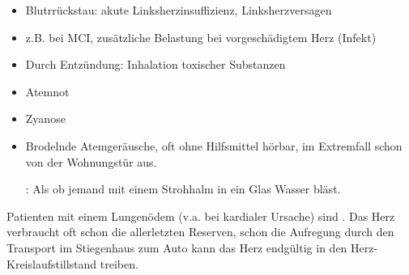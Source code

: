 {
\begin{itemize}
  \item Blutrrückstau: akute Linksherzinsuffizienz,
  Linksherzversagen
  \item z.B. bei MCI, zusätzliche Belastung bei vorgeschädigtem Herz
  (Infekt)
  \item Durch Entzündung: Inhalation toxischer Substanzen
\end{itemize}
}{

}{}{}{}



{
\begin{itemize}
  \item Atemnot
  \item Zyanose
  \item {}Brodelnde Atemgeräusche, oft
  ohne Hilfsmittel hörbar, im Extremfall schon von der Wohnungstür
  aus.
  
  : Als ob jemand mit einem
  Strohhalm in ein Glas Wasser bläst.
\end{itemize}
}{

}{}{}{}




Patienten mit einem Lungenödem (v.a. bei kardialer Ursache) sind
. Das Herz verbraucht oft
schon die allerletzten Reserven, schon die Aufregung durch den
Transport im Stiegenhaus zum Auto kann das Herz endgültig in den
Herz-Kreislaufstillstand treiben. 

